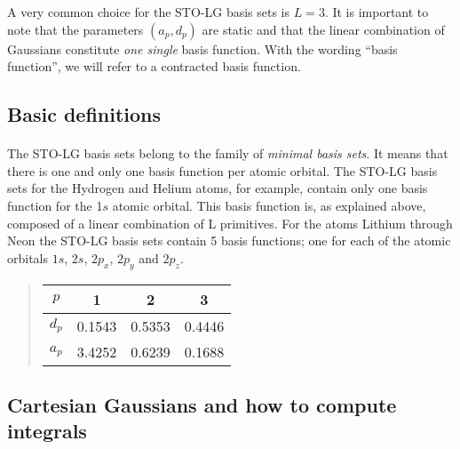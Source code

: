 \documentclass[%
twoside,                 %
final,                   %
10pt]{article}
\begin{document}
A very common choice for the STO-LG basis sets is $L=3$. 
It is important to note that the parameters $(a_p,d_p)$ are static and that the linear combination of Gaussians constitute \emph{one single}
basis function. With the wording ``basis function'', we  will refer to a contracted basis function.



\subsection{Basic definitions}

\paragraph{}

The STO-LG basis sets belong to the family of \emph{minimal basis sets}.
It means that there is one and only one basis function per atomic orbital.
The STO-LG basis sets for the Hydrogen and Helium atoms, for example, contain only one basis
function for the 1$s$ atomic orbital. This basis function is, as explained above, composed of
a linear combination of L primitives. For the atoms Lithium through Neon the STO-LG basis
sets contain 5 basis functions; one for each of the atomic orbitals
$1s$, $2s$, $2p_x$, $2p_y$ and $2p_z$.



\begin{quote}
\begin{tabular}{cccc}
\hline
\multicolumn{1}{c}{ $p$ } & \multicolumn{1}{c}{ 1 } & \multicolumn{1}{c}{ 2 } & \multicolumn{1}{c}{ 3 } \\
\hline
$d_p$ & 0.1543 & 0.5353 & 0.4446 \\
$a_p$ & 3.4252 & 0.6239 & 0.1688 \\
\hline
\end{tabular}
\end{quote}

\noindent



\subsection{Cartesian Gaussians and how to compute integrals}

\paragraph{}
\end{document}
